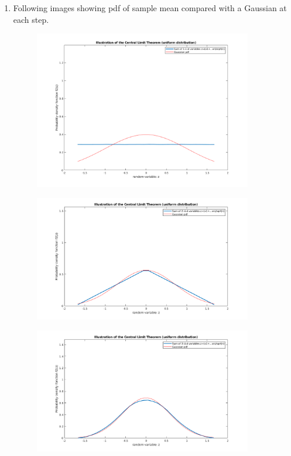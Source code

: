 \documentclass[12pt, letterpaper]{scrartcl}
\begin{document}
\begin{enumerate}[((a))]
    \item
    
    Following images showing pdf of sample mean compared with a Gaussian at each step.
    
    \begin{figure}[H]
    \centering
    \includegraphics[width=0.9\textwidth]{hw5_figures/1.png}
    \end{figure}
    \begin{figure}[H]
    \centering
    \includegraphics[width=0.9\textwidth]{hw5_figures/2.png}
    \end{figure}
    \begin{figure}[H]
    \centering
    \includegraphics[width=0.9\textwidth]{hw5_figures/3.png}

\end{figure}
\end{enumerate}
\end{document}
